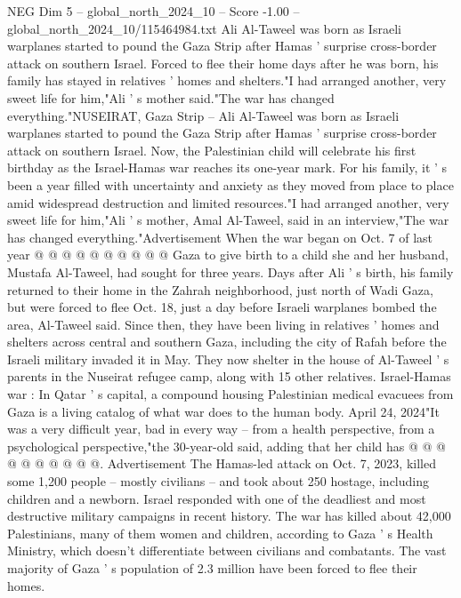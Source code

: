 \begin{textsample}{NEG Dim 5 – global\_north\_2024\_10 – Score -1.00 – global\_north\_2024\_10/115464984.txt}  \label{ex:f5_neg_054}
Ali Al-Taweel was born as Israeli warplanes started to pound the Gaza Strip after Hamas ' surprise cross-border attack on southern Israel.
Forced to flee their home days after he was born, his family has stayed in relatives ' homes and shelters."I had arranged another, very sweet life for him,"Ali ' s mother said."The war has changed everything."NUSEIRAT, Gaza Strip -- Ali Al-Taweel was born as Israeli warplanes started to pound the Gaza Strip after Hamas ' surprise cross-border attack on southern Israel.
Now, the Palestinian child will celebrate his first birthday as the Israel-Hamas war reaches its one-year mark.
For his family, it ' s been a year filled with uncertainty and anxiety as they moved from place to place amid widespread destruction and limited resources."I had arranged another, very sweet life for him,"Ali ' s mother, Amal Al-Taweel, said in an interview,"The war has changed everything."Advertisement When the war began on Oct. 7 of last year @ @ @ @ @ @ @ @ @ @ Gaza to give birth to a child she and her husband, Mustafa Al-Taweel, had sought for three years.
Days after Ali ' s birth, his family returned to their home in the Zahrah neighborhood, just north of Wadi Gaza, but were forced to flee Oct. 18, just a day before Israeli warplanes bombed the area, Al-Taweel said.
Since then, they have been living in relatives ' homes and shelters across central and southern Gaza, including the city of Rafah before the Israeli military invaded it in May.
They now shelter in the house of Al-Taweel ' s parents in the Nuseirat refugee camp, along with 15 other relatives.
Israel-Hamas war : In Qatar ' s capital, a compound housing Palestinian medical evacuees from Gaza is a living catalog of what war does to the human body.
April 24, 2024"It was a very difficult year, bad in every way -- from a health perspective, from a psychological perspective,"the 30-year-old said, adding that her child has @ @ @ @ @ @ @ @ @ @.
Advertisement The Hamas-led attack on Oct. 7, 2023, killed some 1,200 people -- mostly civilians -- and took about 250 hostage, including children and a newborn.
Israel responded with one of the deadliest and most destructive military campaigns in recent history.
The war has killed about 42,000 Palestinians, many of them women and children, according to Gaza ' s Health Ministry, which doesn't differentiate between civilians and combatants.
The vast majority of Gaza ' s population of 2.3 million have been forced to flee their homes.

\end{textsample}
